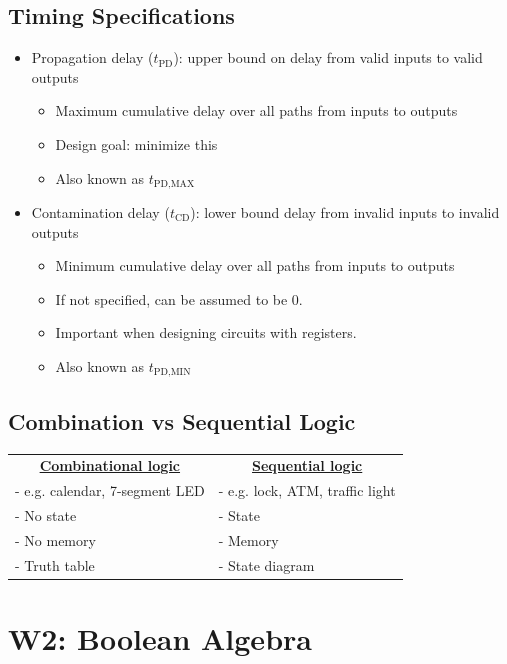 \documentclass[a4paper]{article}
\begin{document}
\subsection{Timing Specifications}
\begin{itemize}
    \item Propagation delay ($t_\text{PD}$): upper bound on delay from valid inputs to valid outputs
    \begin{itemize}[label=$\circ$] 
        \item Maximum cumulative delay over all paths from inputs to outputs
        \item Design goal: minimize this
        \item Also known as $t_\text{PD,MAX}$
    \end{itemize}
    \item Contamination delay ($t_\text{CD}$): lower bound delay from invalid inputs to invalid outputs
    \begin{itemize}[label=$\circ$]
        \item Minimum cumulative delay over all paths from inputs to outputs
        \item If not specified, can be assumed to be 0.
        \item Important when designing circuits with registers.
        \item Also known as $t_\text{PD,MIN}$
    \end{itemize}
\end{itemize}

\subsection{Combination vs Sequential Logic}
\begin{table}[H]
\centering
\begin{tabular}{ll}
\multicolumn{1}{c}{{\ul \textbf{Combinational logic}}} & \multicolumn{1}{c}{{\ul \textbf{Sequential logic}}} \\
- e.g. calendar, 7-segment LED & - e.g. lock, ATM, traffic light \\
- No state & - State \\
- No memory & - Memory \\
- Truth table & - State diagram
\end{tabular}
\end{table}

\newpage
\section{W2: Boolean Algebra}
\end{document}
